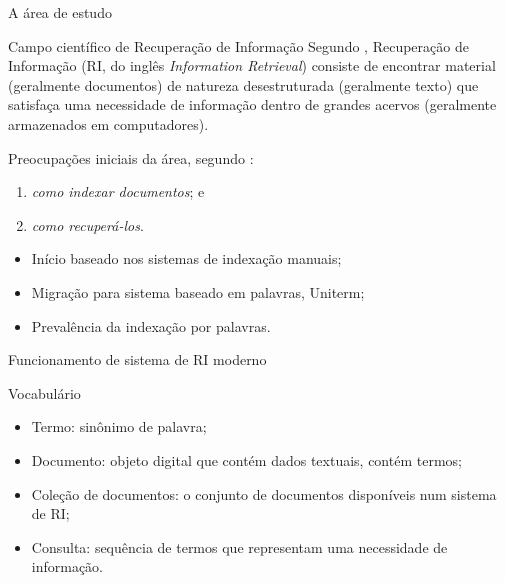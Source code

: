 \documentclass[%
  10pt,%
  aspectratio = 169,%
  compress,%
  t,%
]{beamer}%
\begin{document}
    \begin{frame}{}{A área de estudo}
        \begin{block}{Campo científico de Recuperação de Informação}
            Segundo \cite[p.~1]{Manning2008IIR}, Recuperação de Informação (RI, do inglês \textit{Information Retrieval}) consiste de encontrar material (geralmente documentos) de natureza desestruturada (geralmente texto) que satisfaça uma necessidade de informação dentro de grandes acervos (geralmente armazenados em computadores).
            \par
            Preocupações iniciais da área, segundo \cite[p.~3]{Sanderson2012THIRR}:
            \begin{enumerate}%
                \item \textit{como indexar documentos}; e
                \item \textit{como recuperá-los}.
            \end{enumerate}
        \end{block}
        \begin{itemize}
            \item Início baseado nos sistemas de indexação manuais;
            \item Migração para sistema baseado em palavras, Uniterm;
            \item Prevalência da indexação por palavras.
        \end{itemize}


    \end{frame}

    \begin{frame}[fragile = singleslide]{}{Funcionamento de sistema de RI moderno}%
    \end{frame}

    \begin{frame}[fragile = singleslide]{}{Vocabulário}
        \begin{itemize}
            \item Termo: sinônimo de palavra;
            \item Documento: objeto digital que contém dados textuais, contém termos;
            \item Coleção de documentos: o conjunto de documentos disponíveis num sistema de RI;
            \item Consulta: sequência de termos que representam uma necessidade de informação.
        \end{itemize}
    \end{frame}
\end{document}
